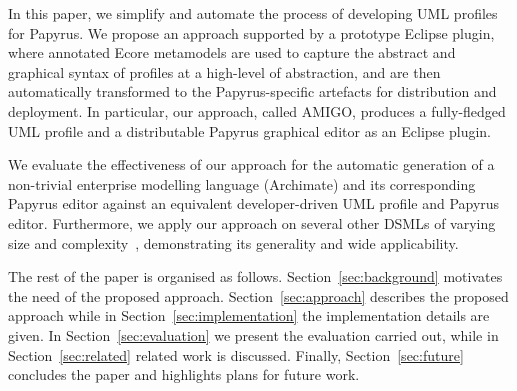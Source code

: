 In this paper, we simplify and automate the process of developing UML profiles 
for Papyrus. We propose an approach supported by a prototype 
Eclipse plugin, where annotated Ecore metamodels are used to capture the 
abstract and graphical syntax of profiles at a high-level of abstraction, and 
are then automatically transformed to the Papyrus-specific artefacts for 
distribution and deployment. In particular, our approach, called AMIGO, produces a fully-fledged UML profile and a distributable Papyrus graphical editor as an Eclipse plugin. 

We evaluate the effectiveness of our approach for the automatic generation of a 
non-trivial enterprise modelling language (Archimate) and its corresponding 
Papyrus editor against an equivalent developer-driven UML profile and Papyrus 
editor. 
Furthermore, we apply our approach on several other DSMLs of varying size and 
complexity~\cite{williams2013metamodels}, demonstrating its generality and wide 
applicability.

The rest of the paper is organised as follows. Section~\ref{sec:background}  motivates the need of the proposed approach. Section~\ref{sec:approach} describes the proposed approach while in Section~\ref{sec:implementation} the implementation details are given. In Section~\ref{sec:evaluation} we present the evaluation carried out, while in Section~\ref{sec:related} related work is discussed. Finally, Section~\ref{sec:future} concludes the paper and highlights plans for future work.